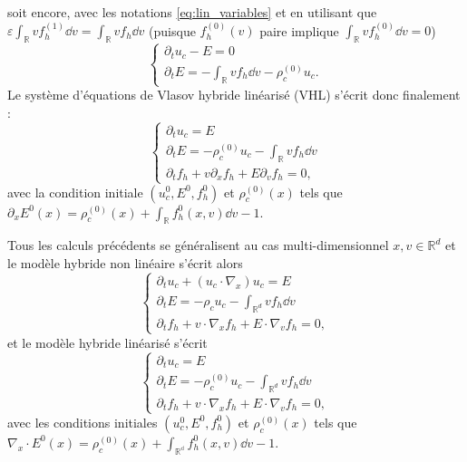 soit encore, avec les notations \eqref{eq:lin_variables} et en utilisant que $\varepsilon \int_{\mathbb{R}} v f_h^{(1)}  \dd{v} = \int_{\mathbb{R}} v f_h  \dd{v}$ (puisque $f^{(0)}_h(v)$ paire implique  $\int_{\mathbb{R}} v f_h^{(0)}  \dd{v}  =0$) %
$$
  \begin{cases}
    \partial_t u_c -  E = 0 \\
    \partial_t E = -\int_{\mathbb{R}} vf_h\dd{v} - \rho_c^{(0)}u_c. 
  \end{cases}
$$
Le système d'équations de Vlasov hybride linéarisé (VHL) s'écrit donc finalement :
\begin{equation}
  \begin{cases}
    \partial_t u_c = E \\
    \partial_t E = -\rho_c^{(0)}u_c -\int_{\mathbb{R}} vf_h\dd{v} \\
    \partial_t f_h + v\partial_x f_h + E \partial_v f_h = 0,
  \end{cases}
\label{eq:vahl}
\end{equation}
avec la condition initiale $(u_c^{0}, E^{0}, f_h^{0})$ et $\rho_c^{(0)}(x)$ tels que $\partial_x E^{0}(x) = \rho_c^{(0)}(x) + \int_{\mathbb{R}} f_h^{0}(x, v) \dd{v} -1$. 

\begin{remark}
  Tous les calculs précédents se généralisent au cas multi-dimensionnel $x, v\in\mathbb{R}^d$ et le modèle hybride non linéaire s'écrit alors 
  \begin{equation}
    \begin{cases}
     \partial_t u_c  + (u_c \cdot \nabla_x ) u_c = E \\
      \partial_t E = -\rho_cu_c -\int_{\mathbb{R}^d} vf_h\dd{v} \\
      \partial_t f_h + v \cdot \nabla_x f_h + E \cdot \nabla_v f_h = 0,
    \end{cases}
  \label{eq:vahnl_multid}
  \end{equation}
  et le modèle hybride linéarisé s'écrit 
  \begin{equation}
    \begin{cases}
     \partial_t u_c = E \\
     \partial_t E = -\rho_c^{(0)}u_c -\int_{\mathbb{R}^d} vf_h\dd{v} \\
      \partial_t f_h + v \cdot \nabla_x f_h + E \cdot \nabla_v f_h = 0,
   \end{cases}
  \label{eq:vahl_multid}
  \end{equation}
  avec les conditions initiales $(u^0_c, E^0, f^0_h)$ et $\rho_c^{(0)}(x)$ tels que $\nabla_x \cdot E^0(x) = \rho_c^{(0)}(x) + \int_{\mathbb{R^d}} f_h^0(x,v)\dd{v} -1$. 
\end{remark}

